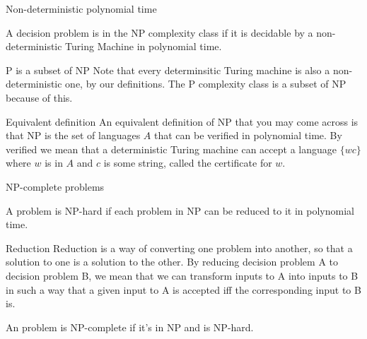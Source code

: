 \begin{frame}{Non-deterministic polynomial time}
  \begin{definition}
    A decision problem is in the NP complexity class if it is decidable by a non-deterministic Turing Machine in polynomial time.
  \end{definition}
  
  \begin{alertblock}{P is a subset of NP}
    Note that every determinsitic Turing machine is also a non-deterministic one, by our definitions.
    The P complexity class is a subset of NP because of this.
  \end{alertblock}

  \begin{alertblock}{Equivalent definition}
    An equivalent definition of NP that you may come across is that NP is the set of languages $A$ that can be verified in polynomial time.
    By verified we mean that a deterministic Turing machine can accept a language $\{ wc \}$ where $w$ is in $A$ and $c$ is some string, called the certificate for $w$.
  \end{alertblock}

\end{frame}


\begin{frame}{NP-complete problems}
  \begin{definition}
    A problem is NP-hard if each problem in NP can be reduced to it in polynomial time.
  \end{definition}

  \begin{alertblock}{Reduction}
    Reduction is a way of converting one problem into another, so that a solution to one is a solution to the other.
    By reducing decision problem A to decision problem B, we mean that we can transform inputs to A into inputs to B in such a way that a given input to A is accepted iff the corresponding input to B is.
  \end{alertblock}

  \begin{definition}
    An problem is NP-complete if it's in NP and is NP-hard.
  \end{definition}
\end{frame}



